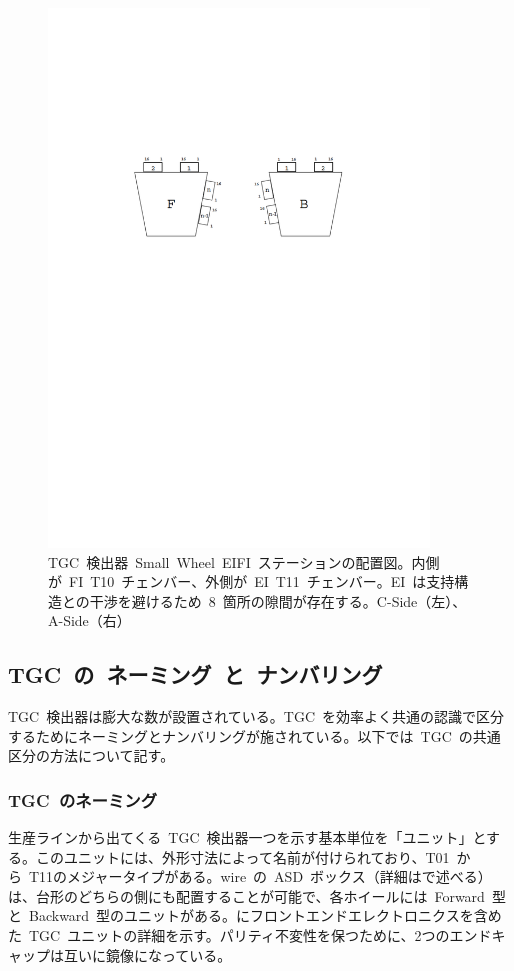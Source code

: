 \begin{figure}[H]
        \centering   
        \includegraphics[width=0.9\textwidth,page=4]{img/pdf/TGC.pdf}
        \caption[TGC 検出器~Small~Wheel~EIFI~ステーションの配置図]{TGC~検出器~Small~Wheel~EIFI~ステーションの配置図。内側が~FI~T10~チェンバー、外側が~EI~T11~チェンバー。EI~は支持構造との干渉を避けるため~8~箇所の隙間が存在する。C-Side（左）、A-Side（右）~\cite{TR:02}}
        \label{fig:tgcSW}
\end{figure}

\subsection{TGC~の~ネーミング~と~ナンバリング}
TGC~検出器は膨大な数が設置されている。TGC~を効率よく共通の認識で区分するためにネーミングとナンバリングが施されている。以下では~TGC~の共通区分の方法について記す。
\subsubsection{TGC~のネーミング}
生産ラインから出てくる~TGC~検出器一つを示す基本単位を「ユニット」とする。このユニットには、外形寸法によって名前が付けられており、T01~から~T11のメジャータイプがある。wire~の~ASD~ボックス（詳細はで述べる）は、台形のどちらの側にも配置することが可能で、各ホイールには~Forward~型と~Backward~型のユニットがある。にフロントエンドエレクトロニクスを含めた~TGC~ユニットの詳細を示す。パリティ不変性を保つために、2つのエンドキャップは互いに鏡像になっている。

